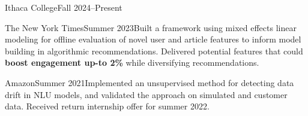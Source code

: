   {Ithaca College}{Fall 2024--Present}{}{}
  
  {The New York Times}{Summer 2023}{}{Built a framework using mixed effects linear modeling for offline evaluation of novel user and article features to inform model building in algorithmic recommendations. Delivered potential features that could \textbf{boost engagement up-to 2\%} while diversifying recommendations.}


  {Amazon}{Summer 2021}{}{Implemented an unsupervised method for detecting data drift in NLU models, and validated the approach on simulated and customer data. Received return internship offer for summer 2022.}
